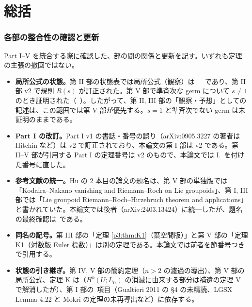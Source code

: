 \part*{総括}
\renewcommand{\thesection}{S.\arabic{section}}\setcounter{section}{0}
\section{各部の整合性の確認と更新}
Part I--V を統合する際に確認した、部の間の関係と更新を記す。いずれも定理の主張の撤回ではない。
\begin{itemize}
\item \textbf{局所公式の状態。}第 II 部の状態表では局所公式（観察）は\tP\ \tV\ \tK\ であり、第 II 部 v2 で規則 $R(s)$ が訂正された。第 V 部で準斉次な germ について $s\ne1$ のとき証明された（\tP\ \tQ）。したがって、第 II, III 部の「観察・予想」としての記述は、この範囲では第 V 部が優先する。$s=1$ と準斉次でない germ は未証明のままである。
\item \textbf{Part I の改訂。}Part I v1 の書誌・番号の誤り（arXiv:0905.3227 の著者は Hitchin など）は v2 で訂正されており、本論文の第 I 部は v2 である。第 II--V 部が引用する Part I の定理番号は v2 のもので、本論文では I.\ を付けた番号に直した。
\item \textbf{参考文献の統一。}Hu の 2 本目の論文の題名は、第 V 部の単独版では「Kodaira--Nakano vanishing and Riemann--Roch on Lie groupoids」、第 I, III 部では「Lie groupoid Riemann--Roch--Hirzebruch theorem and applications」と書かれていた。本論文では後者（arXiv:2403.13424）に統一したが、題名の最終確認は\tQ\ である。
\item \textbf{同名の記号。}第 III 部の「定理 \ref{p3:thm:K1}（葉空間版）」と第 V 部の「定理 K1（対数版 Euler 標数）」は別の定理である。本論文では前者を節番号つきで引用する。
\item \textbf{状態の引き継ぎ。}第 IV, V 部の簡約定理（$n>2$ の濾過の導出）、第 V 部の局所公式、定理 K は（$H^k(U;L_U)$ の消滅に由来する部分は補遺の定理 V で解消したが）、第 I 部の\tQ\ 項目（Gualtieri 2011 の \S4 の未精読、LGSX Lemma 4.22 と Mokri の定理の未再導出など）に依存する。
\end{itemize}

